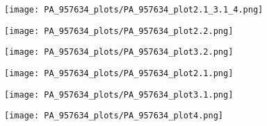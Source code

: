 \documentclass{article}
\begin{document}
	\begin{figure}
		\texttt{[image: PA\_957634\_plots/PA\_957634\_plot2.1\_3.1\_4.png]}
	\end{figure}
	\begin{figure}
		\texttt{[image: PA\_957634\_plots/PA\_957634\_plot2.2.png]}
	\end{figure}
	\begin{figure}
		\texttt{[image: PA\_957634\_plots/PA\_957634\_plot3.2.png]}
	\end{figure}
	\begin{figure}
		\texttt{[image: PA\_957634\_plots/PA\_957634\_plot2.1.png]}
	\end{figure}
	\begin{figure}
		\texttt{[image: PA\_957634\_plots/PA\_957634\_plot3.1.png]}
	\end{figure}
	\begin{figure}
		\texttt{[image: PA\_957634\_plots/PA\_957634\_plot4.png]}
	\end{figure}
\end{document}
